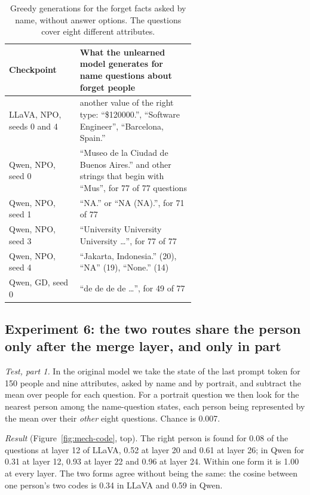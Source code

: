 \documentclass[11pt]{article}
\begin{document}
\begin{table}[!htbp]
\centering\small
\begin{tabular}{@{}lp{0.62\linewidth}@{}}
\toprule
Checkpoint & What the unlearned model generates for name questions about forget people\\
\midrule
LLaVA, NPO, seeds 0 and 4 & another value of the right type: ``\$120000.'', ``Software
Engineer'', ``Barcelona, Spain.''\\
Qwen, NPO, seed 0 & ``Museo de la Ciudad de Buenos Aires.'' and other strings that begin with
``Mus'', for 77 of 77 questions\\
Qwen, NPO, seed 1 & ``NA.'' or ``NA (NA).'', for 71 of 77\\
Qwen, NPO, seed 3 & ``University University University \ldots'', for 77 of 77\\
Qwen, NPO, seed 4 & ``Jakarta, Indonesia.'' (20), ``NA'' (19), ``None.'' (14)\\
Qwen, GD, seed 0 & ``de de de de \ldots'', for 49 of 77\\
\bottomrule
\end{tabular}
\caption{Greedy generations for the forget facts asked by name, without answer options. The
questions cover eight different attributes.}
\label{tab:mech-outputs}
\end{table}

\FloatBarrier
\subsection{Experiment 6: the two routes share the person only after the merge layer, and only in part}
\emph{Test, part 1.} In the original model we take the state of the last prompt token for 150
people and nine attributes, asked by name and by portrait, and subtract the mean over people
for each question. For a portrait question we then look for the nearest person among the
name-question states, each person being represented by the mean over their \emph{other} eight
questions. Chance is 0.007.

\emph{Result} (Figure~\ref{fig:mech-code}, top). The right person is found for 0.08 of the
questions at layer 12 of LLaVA, 0.52 at layer 20 and 0.61 at layer 26; in Qwen for 0.31 at
layer 12, 0.93 at layer 22 and 0.96 at layer 24. Within one form it is 1.00 at every layer.
The two forms agree without being the same: the cosine between one person's two codes is 0.34
in LLaVA and 0.59 in Qwen.
\end{document}
